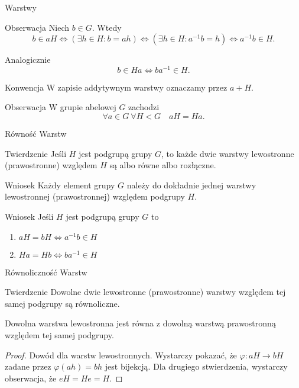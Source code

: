 \documentclass{beamer}
\let\phi\varphi
\begin{document}
\begin{frame}{Warstwy}
    \begin{alertblock}{Obserwacja}
        Niech $b \in G$. Wtedy
        $$b \in aH\Leftrightarrow ( \exists h \in H : b=ah) \Leftrightarrow (\exists h \in H : a^{-1}b = h) \Leftrightarrow a^{-1}b \in H.$$

        Analogicznie
        $$b \in Ha \Leftrightarrow ba^{-1} \in H.$$
    \end{alertblock}
    \pause 
    \begin{alertblock}{Konwencja}
        W zapisie addytywnym warstwy oznaczamy przez $a + H$.
    \end{alertblock}

    \begin{alertblock}{Obserwacja}
        W grupie abelowej $G$ zachodzi 
        $$ \forall a \in G  \ \forall H < G \quad aH = Ha.$$
    \end{alertblock}
\end{frame}

\begin{frame}{Równość Warstw}
    \begin{block}{Twierdzenie}
        Jeśli $H$ jest podgrupą grupy $G$, to każde dwie warstwy lewostronne (prawostronne)
        względem $H$ są albo równe albo rozłączne. 
    \end{block}
    \pause
    \begin{alertblock}{Wniosek}
        Każdy element grupy $G$ należy do dokładnie jednej warstwy lewostronnej (prawostronnej)
        względem podgrupy $H$. 
    \end{alertblock}
    \begin{alertblock}{Wniosek}
        Jeśli $H$ jest podgrupą grupy $G$ to 
        \begin{enumerate}
            \item $aH = bH \Leftrightarrow a^{-1}b \in H$
            \item $Ha = Hb \Leftrightarrow ba^{-1} \in H$
        \end{enumerate}
    \end{alertblock}
\end{frame}

\begin{frame}{Równoliczność Warstw}
    \begin{block}{Twierdzenie}
        Dowolne dwie lewostronne (prawostronne) warstwy względem tej samej podgrupy są równoliczne.

        Dowolna warstwa lewostronna jest równa z dowolną warstwą prawostronną względem tej samej podgrupy.
    \end{block}
    \pause 
    \begin{proof}
        Dowód dla warstw lewostronnych.
        Wystarczy pokazać, że $\phi : aH \rightarrow bH$ zadane przez $\phi(ah) = bh$ jest bijekcją.
        Dla drugiego stwierdzenia, wystarczy obserwacja, że $e H = H e = H$.
    \end{proof}           
\end{frame}
\end{document}
